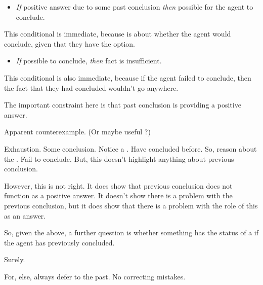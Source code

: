 \begin{note}
  \begin{itemize}
  \item
    \emph{If} positive answer due to some past conclusion \emph{then} possible for the agent to conclude.
  \end{itemize}
  This conditional is immediate, because \qzS{} is about whether the agent would conclude, given that they have the option.
  \begin{itemize}
  \item
    \emph{If} possible to conclude, \emph{then} fact is insufficient.
  \end{itemize}
  This conditional is also immediate, because if the agent failed to conclude, then the fact that they had concluded wouldn't go anywhere.
\end{note}

\begin{note}
  The important constraint here is that past conclusion is providing a positive answer.

  Apparent counterexample. (Or maybe useful \illu{}?)

  Exhaustion.
  Some conclusion.
  Notice a \requ{}.
  Have concluded before.
  So, reason about the \requ{}.
  Fail to conclude.
  But, this doesn't highlight anything about previous conclusion.

  However, this is not right.
  It does show that previous conclusion does not function as a positive answer.
  It doesn't show there is a problem with the previous conclusion, but it does show that there is a problem with the role of this as an answer.
\end{note}

\begin{note}
  So, given the above, a further question is whether something has the status of a \requ{} if the agent has previously concluded.

  Surely.

  For, else, always defer to the past.
  No correcting mistakes.
\end{note}

